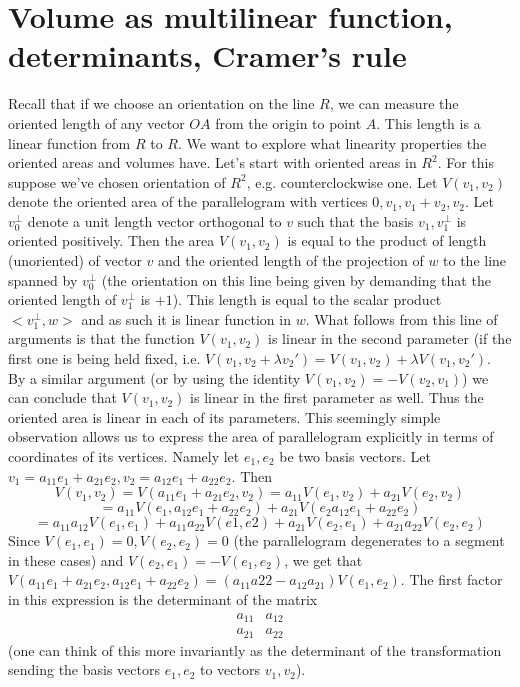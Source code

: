 \section{Volume as multilinear function, determinants, Cramer's rule}
Recall that if we choose an orientation on the line $R$, we can measure the oriented length of any vector $OA$ from the origin to point $A$. This length is a linear function from $R$ to $R$. We want to explore what linearity properties the oriented areas and volumes have.
Let's start with oriented areas in $R^2$. For this suppose we've chosen orientation of $R^2$, e.g. counterclockwise one. Let $V(v_1,v_2)$ denote the oriented area of the parallelogram with vertices $0,v_1,v_1+v_2,v_2$. Let $v_0^\perp$ denote a unit length vector orthogonal to $v$ such that the basis $v_1,v_1^\perp$ is oriented positively. Then the area $V(v_1,v_2)$ is equal to the product of length (unoriented) of vector $v$ and the oriented length of the projection of $w$ to the line spanned by $v_0^\perp$ (the orientation on this line being given by demanding that the oriented length of $v_1^\perp $ is $+1$). This length is equal to the scalar product $<v_1^\perp,w>$ and as such it is linear function in $w$.
What follows from this line of arguments is that the function $V(v_1,v_2)$ is linear in the second parameter (if the first one is being held fixed, i.e. $V(v_1,v_2+\lambda v_2')=V(v_1,v_2)+\lambda V(v_1,v_2')$. By a similar argument (or by using the identity $V(v_1,v_2)=-V(v_2,v_1)$) we can conclude that $V(v_1,v_2)$ is linear in the first parameter as well. Thus the oriented area is linear in each of its parameters. This seemingly simple observation allows us to express the area of parallelogram explicitly in terms of coordinates of its vertices. Namely let $e_1,e_2$ be two basis vectors. Let $v_1=a_{11}e_1+a_{21}e_2, v_2=a_{12}e_1+a_{22}e_2$. Then $$V(v_1,v_2)=V(a_{11}e_1+a_{21}e_2,v_2)=a_{11}V(e_1,v_2)+a_{21}V(e_2,v_2)$$ $$=a_{11}V(e_1,a_{12}e_1+a_{22}e_2)+a_{21}V(e_2a_{12}e_1+a_{22}e_2)$$ $$=a_{11}a_{12}V(e_1,e_1)+a_{11}a_{22}V(e1,e2)+a_{21}V(e_2,e_1)+a_{21}a_{22}V(e_2,e_2)$$
Since $V(e_1,e_1)=0, V(e_2,e_2)=0$ (the parallelogram degenerates to a segment in these cases) and $V(e_2,e_1)=-V(e_1,e_2)$, we get that $V(a_{11}e_1+a_{21}e_2,a_{12}e_1+a_{22}e_2)=(a_{11}a{22}-a_{12}a_{21})V(e_1,e_2)$.
The first factor in this expression is the determinant of the matrix $$\begin{array}{cc}a_{11} & a_{12} \\ a_{21} & a_{22}\end{array}$$ (one can think of this more invariantly as the determinant of the transformation sending the basis vectors $e_1,e_2$ to vectors $v_1,v_2$).
